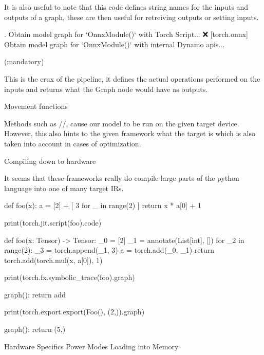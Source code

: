 It is also useful to note that this code defines
string names for the inputs and outputs of a graph,
these are then useful for retreiving outputs or setting inputs.

.
 Obtain model graph for `OnnxModule()` with Torch Script... ❌
[torch.onnx] Obtain model graph for `OnnxModule()` with internal Dynamo apis...
\endtt

\secc {}

\secc {} (mandatory)

This is the crux of the pipeline,
it defines the actual operations performed on
the inputs and returns what the Graph node would have
as outputs.

\secc Movement functions

Methods such as //,
cause our model to be run on the given target device.
However, this also hints to the given framework
what the target is which is also taken into account
in cases of optimization.

\sec Compiling down to hardware

It seems that these frameworks really do
compile large parts of the python language
into one of many target IRs.

\begtt{}
def foo(x):
  a = [2] + [ 3 for _ in range(2) ]
  return x * a[0] + 1
\endtt

\begtt
print(torch.jit.script(foo).code)

def foo(x: Tensor) -> Tensor:
  _0 = [2]
  _1 = annotate(List[int], [])
  for _2 in range(2):
    _3 = torch.append(_1, 3)
  a = torch.add(_0, _1)
  return torch.add(torch.mul(x, a[0]), 1)
\endtt

\begtt
print(torch.fx.symbolic_trace(foo).graph)

graph():
  return add
\endtt

\begtt
print(torch.export.export(Foo(), (2,)).graph)

graph():
  return (5,)
\endtt
{}

\chap Hardware Specifics
\sec Power Modes
\sec Loading into Memory

